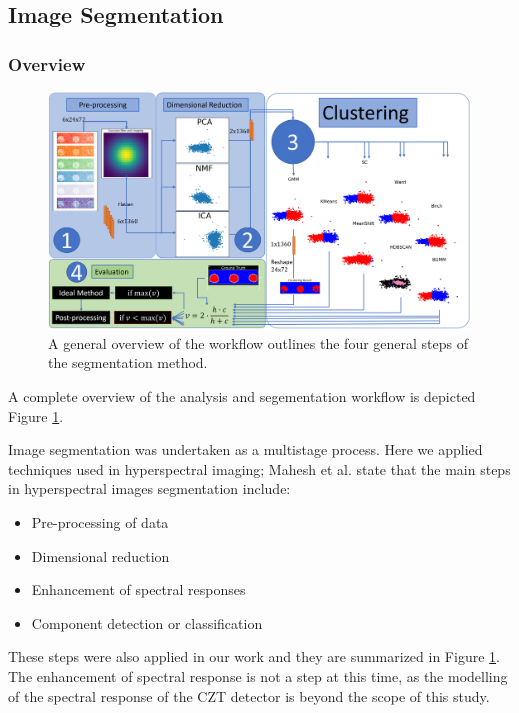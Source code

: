 \documentclass[a4paper,11pt]{article}
\begin{document}
\subsection{Image Segmentation}
\subsubsection{Overview}

\begin{figure}[htbp]

\includegraphics[width=\textwidth]{figures/flow_chart.png}

\caption{A general overview of the workflow outlines the four general steps of the segmentation method.}
\label{overview}
\end{figure}

\noindent A complete overview of the analysis and segementation workflow is depicted Figure \ref{overview}.

Image segmentation was undertaken as a multistage process. Here we applied techniques used in hyperspectral imaging; Mahesh et al. \cite{Mahesh2015HyperspectralMaterials} state that the main steps in hyperspectral images segmentation include:
\begin{itemize}
\item Pre-processing of data 
\item Dimensional reduction
\item Enhancement of spectral responses
\item Component detection or classification 
\end{itemize}
These steps were also applied in our work and they are summarized in Figure \ref{overview}. The enhancement of spectral response is not a step at this time, as the modelling of the spectral response of the CZT detector is beyond the scope of this study.
\end{document}
